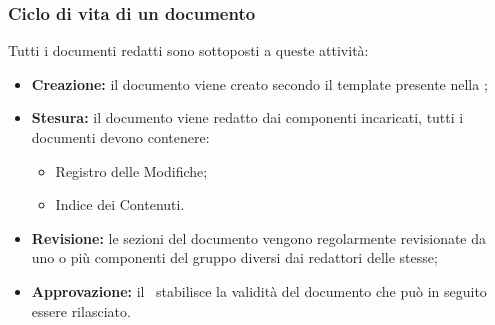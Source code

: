 \subsubsection{Ciclo di vita di un documento}\label{CicloDocumentazione}
Tutti i documenti redatti sono sottoposti a queste attività:
\begin{itemize}
	\item \textbf{Creazione:} il documento viene creato secondo il template presente nella ;
	\item \textbf{Stesura:} il documento viene redatto dai componenti incaricati, tutti i documenti devono contenere:
	\begin{itemize}
		\item Registro delle Modifiche;
		\item Indice dei Contenuti.
	\end{itemize}
	\item \textbf{Revisione:} le sezioni del documento vengono regolarmente revisionate da uno o più componenti del gruppo diversi dai redattori delle stesse;
	\item \textbf{Approvazione:} il \Responsabile\ stabilisce la validità del documento che può in seguito essere rilasciato. 
\end{itemize}

